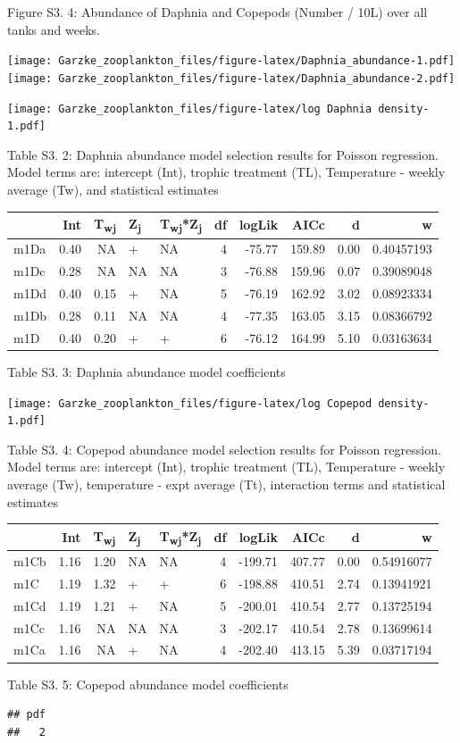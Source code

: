 \documentclass[]{article}
\begin{document}
Figure S3. 4: Abundance of Daphnia and Copepods (Number / 10L) over all
tanks and weeks.

\texttt{[image: Garzke\_zooplankton\_files/figure-latex/Daphnia\_abundance-1.pdf]}
\texttt{[image: Garzke\_zooplankton\_files/figure-latex/Daphnia\_abundance-2.pdf]}

\texttt{[image: Garzke\_zooplankton\_files/figure-latex/log Daphnia density-1.pdf]}

Table S3. 2: Daphnia abundance model selection results for Poisson
regression. Model terms are: intercept (Int), trophic treatment (TL),
Temperature - weekly average (Tw), and statistical estimates

\begin{longtable}[]{@{}lrrllrrrrr@{}}
\toprule
& Int & T\textsubscript{wj} & Z\textsubscript{j} &
T\textsubscript{wj}*Z\textsubscript{j} & df & logLik & AICc & d &
w\tabularnewline
\midrule
\endhead
m1Da & 0.40 & NA & + & NA & 4 & -75.77 & 159.89 & 0.00 &
0.40457193\tabularnewline
m1Dc & 0.28 & NA & NA & NA & 3 & -76.88 & 159.96 & 0.07 &
0.39089048\tabularnewline
m1Dd & 0.40 & 0.15 & + & NA & 5 & -76.19 & 162.92 & 3.02 &
0.08923334\tabularnewline
m1Db & 0.28 & 0.11 & NA & NA & 4 & -77.35 & 163.05 & 3.15 &
0.08366792\tabularnewline
m1D & 0.40 & 0.20 & + & + & 6 & -76.12 & 164.99 & 5.10 &
0.03163634\tabularnewline
\bottomrule
\end{longtable}

Table S3. 3: Daphnia abundance model coefficients

\texttt{[image: Garzke\_zooplankton\_files/figure-latex/log Copepod density-1.pdf]}

Table S3. 4: Copepod abundance model selection results for Poisson
regression. Model terms are: intercept (Int), trophic treatment (TL),
Temperature - weekly average (Tw), temperature - expt average (Tt),
interaction terms and statistical estimates

\begin{longtable}[]{@{}lrrllrrrrr@{}}
\toprule
& Int & T\textsubscript{wj} & Z\textsubscript{j} &
T\textsubscript{wj}*Z\textsubscript{j} & df & logLik & AICc & d &
w\tabularnewline
\midrule
\endhead
m1Cb & 1.16 & 1.20 & NA & NA & 4 & -199.71 & 407.77 & 0.00 &
0.54916077\tabularnewline
m1C & 1.19 & 1.32 & + & + & 6 & -198.88 & 410.51 & 2.74 &
0.13941921\tabularnewline
m1Cd & 1.19 & 1.21 & + & NA & 5 & -200.01 & 410.54 & 2.77 &
0.13725194\tabularnewline
m1Cc & 1.16 & NA & NA & NA & 3 & -202.17 & 410.54 & 2.78 &
0.13699614\tabularnewline
m1Ca & 1.16 & NA & + & NA & 4 & -202.40 & 413.15 & 5.39 &
0.03717194\tabularnewline
\bottomrule
\end{longtable}

Table S3. 5: Copepod abundance model coefficients

\begin{verbatim}
## pdf 
##   2
\end{verbatim}
\end{document}
